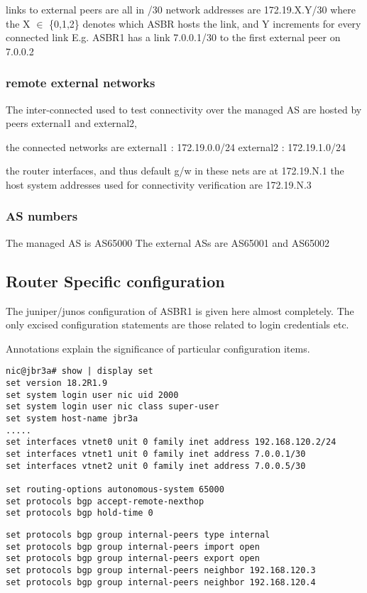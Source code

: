 links to external peers are all in /30
network addresses are 172.19.X.Y/30
where the X $\in$ \{0,1,2\} denotes which ASBR hosts the link, and Y increments for every connected link
E.g. ASBR1 has a link 7.0.0.1/30 to the first external peer on 7.0.0.2

\subsubsection{remote external networks}
The inter-connected used to test connectivity over the managed AS are hosted by peers external1 and external2,

the connected networks are
external1 : 172.19.0.0/24
external2 : 172.19.1.0/24

the router interfaces, and thus default g/w in these nets are at 172.19.N.1
the host system addresses used for connectivity verification are 172.19.N.3

\subsubsection{AS numbers}
The managed AS is AS65000
The external ASs are AS65001 and AS65002

\subsection{Router Specific configuration}

The juniper/junos configuration of ASBR1 is given here almost completely.
The only excised configuration statements are those related to login credentials etc.

Annotations explain the significance of particular configuration items.
\begin{lstlisting}[title=Physical Interfaces and global settings]
nic@jbr3a# show | display set
set version 18.2R1.9
set system login user nic uid 2000
set system login user nic class super-user
set system host-name jbr3a
.....
set interfaces vtnet0 unit 0 family inet address 192.168.120.2/24
set interfaces vtnet1 unit 0 family inet address 7.0.0.1/30
set interfaces vtnet2 unit 0 family inet address 7.0.0.5/30

set routing-options autonomous-system 65000
set protocols bgp accept-remote-nexthop
set protocols bgp hold-time 0
\end{lstlisting}

\begin{lstlisting}[title=IBGP peers - import and export policy are open\, so all known routes are announced]
set protocols bgp group internal-peers type internal
set protocols bgp group internal-peers import open
set protocols bgp group internal-peers export open
set protocols bgp group internal-peers neighbor 192.168.120.3
set protocols bgp group internal-peers neighbor 192.168.120.4
\end{lstlisting}


